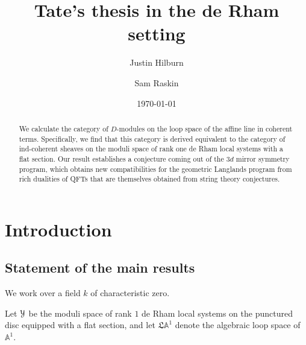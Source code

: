 \documentclass[reqno,11pt]{amsart}
\date{\today}
\numberwithin{equation}{subsection}
\theoremstyle{remark}
\newcommand{\bA}{{\mathbb A}}
\newcommand{\sY}{{\EuScript Y}}
\newcommand{\fL}{{\mathfrak L}}
\begin{document}
\frenchspacing

\setlength{\epigraphwidth}{0.4\textwidth}
\renewcommand{\epigraphsize}{\footnotesize}

\begin{abstract}

We calculate the category of $D$-modules on the loop space of the affine line 
in coherent terms. Specifically, we find that this category is derived equivalent
to the category of 
ind-coherent sheaves on the moduli space of rank one de Rham local systems
with a flat section. Our result establishes a conjecture coming out of the 
$3d$ mirror symmetry program, which obtains new compatibilities
for the geometric Langlands program from rich dualities of QFTs that 
are themselves obtained from string theory conjectures.   

\end{abstract}

\title{Tate's thesis in the de Rham setting}

\author{Justin Hilburn}

\address{Perimeter Institute,
31 Caroline St N, Waterloo, ON N2L 2Y5, Canada}


\author{Sam Raskin}

\address{The University of Texas at Austin, 
Department of Mathematics, 
RLM 8.100, 2515 Speedway Stop C1200, 
Austin, TX 78712}


\maketitle

\setcounter{tocdepth}{1}
\tableofcontents

\section{Introduction}\label{s:intro}

\subsection{Statement of the main results}

We work over a field $k$ of characteristic zero. 

Let $\sY$ be the moduli space of rank $1$ de Rham local systems on 
the punctured disc equipped with a flat section, and 
let $\fL \bA^1$ denote the algebraic loop space of $\bA^1$.
\end{document}
